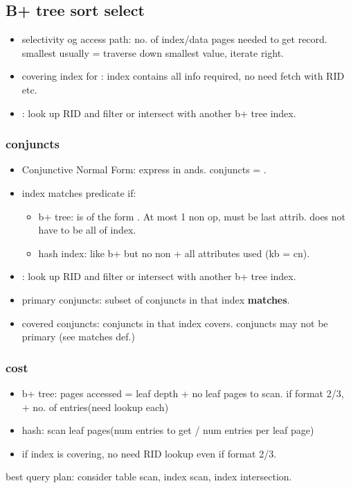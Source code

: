\documentclass{article}
\begin{document}
\begin{multicols*}{4}
\subsection{B+ tree sort select}
\begin{itemize}
  \item selectivity og access path: no. of index/data pages needed to get record. smallest usually = traverse down smallest value, iterate right.
  \item covering index for : index contains all info required, no need fetch with RID etc.
  \item {}: look up RID and filter or intersect with another b+ tree index.
\end{itemize}

\subsubsection{conjuncts}
\begin{itemize}
  \item Conjunctive Normal Form: express in ands. conjuncts = .
  \item index  matches predicate  if:
  \begin{itemize}
    \item b+ tree:  is of the form . At most 1 non \codeword{==} op, must be last attrib. does not have to be all of index.
    \item hash index: like b+ but no non \codeword{==} + all attributes used (kb = cn).
  \end{itemize}
  \item {}: look up RID and filter or intersect with another b+ tree index.
  \item primary conjuncts: subset of conjuncts in  that index \textbf{matches}.
  \item covered conjuncts: conjuncts in  that index covers. conjuncts may not be primary (see matches def.)
\end{itemize}

\subsubsection{cost}
\begin{itemize}
  \item b+ tree: pages accessed = leaf depth + no leaf pages to scan. if format 2/3, + no. of entries(need lookup each)
  \item hash: scan leaf pages(num entries to get / num entries per leaf page)
  \item if index is covering, no need RID lookup even if format 2/3.
\end{itemize}
best query plan: consider table scan, index scan, index intersection.

\end{multicols*}
\end{document}
